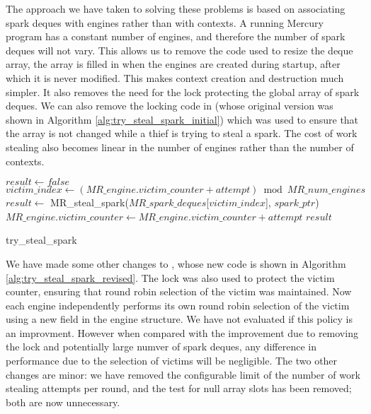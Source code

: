 The approach we have taken to solving these problems is based on associating
spark deques with engines rather than with contexts.
A running Mercury program has a constant number of engines,
and therefore the number of spark deques will not vary.
This allows us to remove the code used to resize the deque array,
the array is filled in when the engines are created during startup,
after which it is never modified.
This makes context creation and destruction much simpler.
It also removes the need for the lock protecting the global array of spark
deques.
We can also remove the locking code in \trystealspark
(whose original version was shown in Algorithm
\ref{alg:try_steal_spark_initial})
which was used to
ensure that the array is not changed while a thief is trying to steal a
spark.
The cost of work stealing also becomes linear in the number of engines
rather than the number of contexts.

\begin{algorithm}[tbp]
\begin{algorithmic}[1]
  \State $result \gets false$
    \State $victim\_index \gets
        (MR\_engine.victim\_counter + attempt) \bmod MR\_num\_engines$
    \State $result \gets$
        MR\_steal\_spark($MR\_spark\_deques$[$victim\_index$], $spark\_ptr$)
      \State \Break
    \EndIf
  \EndFor
  \State $MR\_engine.victim\_counter \gets
    MR\_engine.victim\_counter + attempt$
  \State \Return $result$
\EndProcedure
\end{algorithmic}
\caption{try\_steal\_spark}
\label{alg:try_steal_spark_revised}
\end{algorithm}

We have made some other changes to \trystealspark,
whose new code is shown in Algorithm \ref{alg:try_steal_spark_revised}.
The lock was also used to protect the victim counter,
ensuring that round robin selection of the victim was maintained.
Now each engine independently performs its own round robin selection of the
victim using a new field  in the engine structure.
We have not evaluated if this policy is an improvment.
However when compared with the improvement due to removing the lock and
potentially large numver of spark deques,
any difference in performance due to the selection of victims will be
negligible.
The two other changes are minor:
we have removed the configurable limit of the number of work stealing
attempts per round,
and the test for null array slots has been removed;
both are now unnecessary.

